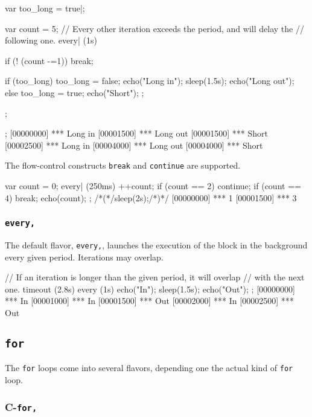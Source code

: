 \begin{urbiscript}
{
  var too_long = true|;

  var count = 5;
  // Every other iteration exceeds the period, and will delay the
  // following one.
  every| (1s)
  {
    if (! (count -=1))
      break;

    if (too_long)
    {
      too_long = false;
      echo("Long in");
      sleep(1.5s);
      echo("Long out");
    }
    else
    {
      too_long = true;
      echo("Short");
    };
  };
};
[00000000] *** Long in
[00001500] *** Long out
[00001500] *** Short
[00002500] *** Long in
[00004000] *** Long out
[00004000] *** Short
\end{urbiscript}

The flow-control constructs \lstinline{break} and \lstinline{continue}
are supported.

\begin{urbiscript}
{
  var count = 0;
  every| (250ms)
  {
    ++count;
    if (count == 2)
      continue;
    if (count == 4)
      break;
    echo(count);
  }
};
/*(*/sleep(2s);/*)*/
[00000000] *** 1
[00001500] *** 3
\end{urbiscript}



\subsubsection{\lstinline{every,}}
The default flavor, \lstinline|every,|, launches the execution of the
block in the background every given period. Iterations may overlap.

\begin{urbiscript}[firstnumber=1]
// If an iteration is longer than the given period, it will overlap
// with the next one.
timeout (2.8s)
  every (1s)
  {
    echo("In");
    sleep(1.5s);
    echo("Out");
  };
[00000000] *** In
[00001000] *** In
[00001500] *** Out
[00002000] *** In
[00002500] *** Out
\end{urbiscript}

\subsection{\lstinline{for}}

The \lstinline{for} loops come into several flavors, depending one the
actual kind of \lstinline{for} loop.

\subsubsection{C-\lstinline{for,}}
\experimentalremoved{}

